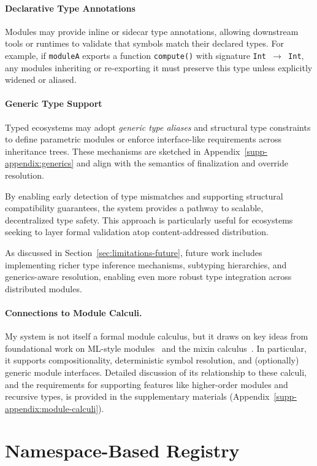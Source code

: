 \documentclass[sigplan,screen]{acmart}
\begin{document}
\paragraph{Declarative Type Annotations}
Modules may provide inline or sidecar type annotations, allowing downstream tools or runtimes to validate that symbols match their declared types. For example, if \texttt{moduleA} exports a function \texttt{compute()} with signature \texttt{Int $\to$ Int}, any modules inheriting or re-exporting it must preserve this type unless explicitly widened or aliased.

\paragraph{Generic Type Support}
Typed ecosystems may adopt \emph{generic type aliases} and structural type constraints to define parametric modules or enforce interface-like requirements across inheritance trees. These mechanisms are sketched in Appendix~\ref{supp-appendix:generics} and align with the semantics of finalization and override resolution.

By enabling early detection of type mismatches and supporting structural compatibility guarantees, the system provides a pathway to scalable, decentralized type safety. This approach is particularly useful for ecosystems seeking to layer formal validation atop content-addressed distribution.

As discussed in Section~\ref{sec:limitations-future}, future work includes implementing richer type inference mechanisms, subtyping hierarchies, and generics-aware resolution, enabling even more robust type integration across distributed modules.

\paragraph{Connections to Module Calculi.}
My system is not itself a formal module calculus, but it draws on key ideas from foundational work on ML-style modules~\cite{ml_modules} and the mixin calculus~\cite{mixin_calculus}. In particular, it supports compositionality, deterministic symbol resolution, and (optionally) generic module interfaces. Detailed discussion of its relationship to these calculi, and the requirements for supporting features like higher-order modules and recursive types, is provided in the supplementary materials (Appendix~\ref{supp-appendix:module-calculi}).

\section{Namespace-Based Registry}
\label{sec:namespace-based-registry}
\end{document}
